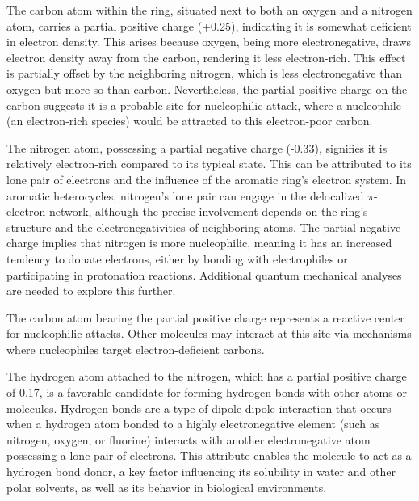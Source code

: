 The carbon atom within the ring, situated next to both an oxygen and a nitrogen atom, carries a partial positive charge (+0.25), indicating it is somewhat deficient in electron density. This arises because oxygen, being more electronegative, draws electron density away from the carbon, rendering it less electron-rich. This effect is partially offset by the neighboring nitrogen, which is less electronegative than oxygen but more so than carbon. Nevertheless, the partial positive charge on the carbon suggests it is a probable site for nucleophilic attack, where a nucleophile (an electron-rich species) would be attracted to this electron-poor carbon.

The nitrogen atom, possessing a partial negative charge (-0.33), signifies it is relatively electron-rich compared to its typical state. This can be attributed to its lone pair of electrons and the influence of the aromatic ring's electron system. In aromatic heterocycles, nitrogen’s lone pair can engage in the delocalized $\pi$-electron network, although the precise involvement depends on the ring’s structure and the electronegativities of neighboring atoms. The partial negative charge implies that nitrogen is more nucleophilic, meaning it has an increased tendency to donate electrons, either by bonding with electrophiles or participating in protonation reactions. Additional quantum mechanical analyses are needed to explore this further.

The carbon atom bearing the partial positive charge represents a reactive center for nucleophilic attacks. Other molecules may interact at this site via mechanisms where nucleophiles target electron-deficient carbons.

The hydrogen atom attached to the nitrogen, which has a partial positive charge of 0.17, is a favorable candidate for forming hydrogen bonds with other atoms or molecules. Hydrogen bonds are a type of dipole-dipole interaction that occurs when a hydrogen atom bonded to a highly electronegative element (such as nitrogen, oxygen, or fluorine) interacts with another electronegative atom possessing a lone pair of electrons. This attribute enables the molecule to act as a hydrogen bond donor, a key factor influencing its solubility in water and other polar solvents, as well as its behavior in biological environments.


